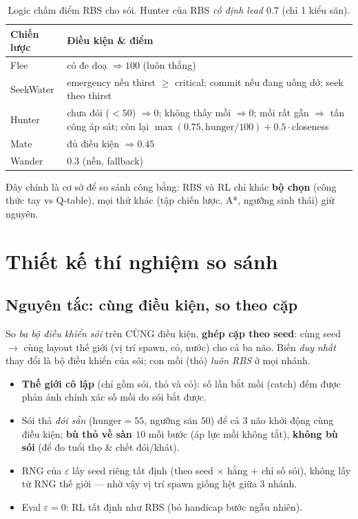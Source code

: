 \documentclass[11pt,a4paper]{article}
\begin{document}
\begin{table}[h]
\centering
\caption{Logic chấm điểm RBS cho sói. Hunter của RBS \emph{cố định lead $0.7$} (chỉ 1 kiểu săn).}
\label{tab:rbs}
\small
\begin{tabular}{lp{9.6cm}}
\toprule
Chiến lược & Điều kiện \& điểm \\
\midrule
Flee      & có đe doạ $\Rightarrow 100$ (luôn thắng) \\
SeekWater & emergency nếu thirst $\geq$ critical; commit nếu đang uống dở; seek theo thirst \\
Hunter    & chưa đói ($<50$) $\Rightarrow 0$; không thấy mồi $\Rightarrow 0$; mồi rất gần $\Rightarrow$ tấn công áp sát; còn lại $\max(0.75,\text{hunger}/100)+0.5\cdot$closeness \\
Mate      & đủ điều kiện $\Rightarrow 0.45$ \\
Wander    & $0.3$ (nền, fallback) \\
\bottomrule
\end{tabular}
\end{table}

Đây chính là cơ sở để so sánh công bằng: RBS và RL chỉ khác \textbf{bộ chọn} (công thức tay vs
Q-table), mọi thứ khác (tập chiến lược, A*, ngưỡng sinh thái) giữ nguyên.

\section{Thiết kế thí nghiệm so sánh}\label{sec:exp}

\subsection{Nguyên tắc: cùng điều kiện, so theo cặp}

So \emph{ba bộ điều khiển sói} trên CÙNG điều kiện, \textbf{ghép cặp theo seed}: cùng seed $\to$
cùng layout thế giới (vị trí spawn, cỏ, nước) cho cả ba não. Biến \emph{duy nhất} thay đổi là bộ
điều khiển của sói; con mồi (thỏ) \emph{luôn RBS} ở mọi nhánh.

\begin{itemize}[leftmargin=1.4em,itemsep=1pt]
  \item \textbf{Thế giới cô lập} (chỉ gồm sói, thỏ và cỏ): số lần bắt mồi (catch) đếm được phản ánh
        chính xác số mồi do sói bắt được.
  \item Sói thả \emph{đói sẵn} ($\text{hunger}=55$, ngưỡng săn $50$) để cả 3 não khởi động cùng điều
        kiện; \textbf{bù thỏ về sàn $10$} mỗi bước (áp lực mồi không tắt), \textbf{không bù sói} (để
        đo tuổi thọ \& chết đói/khát).
  \item RNG của $\varepsilon$ lấy seed riêng tất định (theo seed $\times$ hằng $+$ chỉ số sói), không
        lấy từ RNG thế giới --- nhờ vậy vị trí spawn giống hệt giữa 3 nhánh.
  \item Eval $\varepsilon=0$: RL tất định như RBS (bỏ handicap bước ngẫu nhiên).
\end{itemize}
\end{document}
